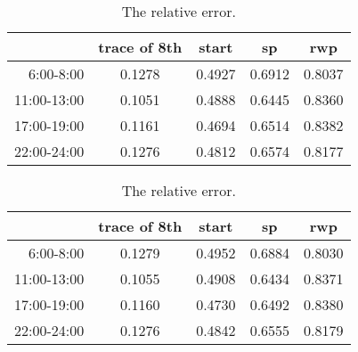 \begin{table}[!h]
\caption{The relative error.}\label{table_relative_err}
\centering
\begin{tabular}{r|c|c|c|c}
\hline
	&trace of 8th	&start	&sp	&rwp\\
\hline
 6:00-8:00&
0.1278&	0.4927&	0.6912&	0.8037\\ 
 11:00-13:00&
0.1051&	0.4888&	0.6445&	0.8360\\
 17:00-19:00&
0.1161&	0.4694&	0.6514&	0.8382\\
 22:00-24:00&
0.1276&	0.4812&	0.6574&	0.8177\\
\hline
\end{tabular}
\begin{tabular}{r|c|c|c|c}
\hline
	&trace of 8th	&start	&sp	&rwp\\
\hline
 6:00-8:00&
0.1279&	0.4952&	0.6884&	0.8030\\
 11:00-13:00&
0.1055&	0.4908&	0.6434&	0.8371\\
 17:00-19:00&
0.1160&	0.4730&	0.6492&	0.8380\\
 22:00-24:00&
0.1276&	0.4842&	0.6555&	0.8179\\
\hline
\end{tabular}
\end{table}
